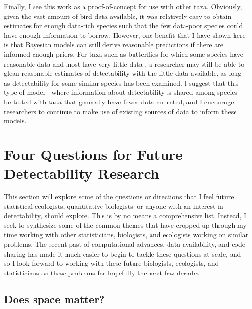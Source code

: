 \par Finally, I see this work as a proof-of-concept for use with other taxa.
Obviously, given the vast amount of bird data available, it was relatively easy to obtain estimates for enough data-rich species such that the few data-poor species could have enough information to borrow. 
However, one benefit that I have shown here is that Bayesian models can still derive reasonable predictions if there are informed enough priors.
For taxa such as butterflies for which some species have reasonable data and most have very little data \citep{lewthwaite_geographical_2022}, a researcher may still be able to glean reasonable estimates of detectability with the little data available, as long as detectability for some similar species has been examined.
I suggest that this type of model---where information about detectability is shared among species---be tested with taxa that generally have fewer data collected, and I encourage researchers to continue to make use of existing sources of data \citep{binley_minimizing_2023} to inform these models.

\section{Four Questions for Future Detectability Research}

\par This section will explore some of the questions or directions that I feel future statistical ecologists, quantitative biologists, or anyone with an interest in detectability, should explore.
This is by no means a comprehensive list.
Instead, I seek to synthesize some of the common themes that have cropped up through my time working with other statisticians, biologists, and ecologists working on similar problems.
The recent past of computational advances, data availability, and code sharing has made it much easier to begin to tackle these questions at scale, and so I look forward to working with these future biologists, ecologists, and statisticians on these problems for hopefully the next few decades.

\subsection{Does space matter?}


